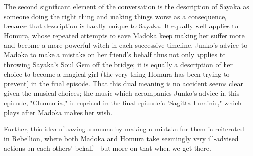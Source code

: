 The second significant element of the conversation is the description of Sayaka as someone doing the right thing and making things worse as a consequence, because that description is hardly unique to Sayaka. It equally well applies to Homura, whose repeated attempts to save Madoka keep making her suffer more and become a more powerful witch in each successive timeline. Junko's advice to Madoka to make a mistake on her friend's behalf thus not only applies to throwing Sayaka's Soul Gem off the bridge; it is equally a description of her choice to become a magical girl (the very thing Homura has been trying to prevent) in the final episode. That this dual meaning is no accident seems clear given the musical choices; the music which accompanies Junko's advice in this episode, "Clementia," is reprised in the final episode's "Sagitta Luminis," which plays after Madoka makes her wish.

Further, this idea of saving someone by making a mistake for them is reiterated in Rebellion, where both Madoka and Homura take seemingly very ill-advised actions on each others' behalf—but more on that when we get there.
